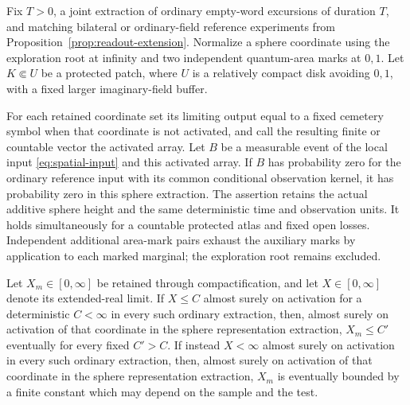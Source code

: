 \begin{proposition}
\label{prop:sphere-support}
Fix \(T>0\), a joint extraction of ordinary empty-word excursions of
duration \(T\), and matching bilateral or ordinary-field reference
experiments from Proposition~\ref{prop:readout-extension}.  Normalize
a sphere coordinate using the exploration root at infinity and two
independent quantum-area marks at \(0,1\).  Let \(K\Subset U\) be a
protected patch, where \(U\) is a relatively compact disk avoiding
\(0,1\), with a fixed larger imaginary-field buffer.

For each retained coordinate set its limiting output equal to a fixed
cemetery symbol when that coordinate is not activated, and call the
resulting finite or countable vector the activated array.  Let \(B\)
be a measurable event of the local input \eqref{eq:spatial-input} and
this activated array.  If \(B\) has probability zero for the ordinary
reference input with its common conditional observation kernel, it has
probability zero in this sphere extraction.  The assertion retains the
actual additive sphere height and the same deterministic time and
observation units.  It holds simultaneously for a countable protected
atlas and fixed open losses.  Independent additional area-mark pairs
exhaust the auxiliary marks by application to each marked marginal;
the exploration root remains excluded.

Let \(X_m\in[0,\infty]\) be retained through compactification, and
let \(X\in[0,\infty]\) denote its extended-real limit.  If \(X\le C\)
almost surely on activation for a deterministic \(C<\infty\) in every
such ordinary extraction, then, almost surely on activation of that
coordinate in the sphere representation extraction, \(X_m\le C'\)
eventually for every fixed \(C'>C\).  If instead \(X<\infty\) almost
surely on activation in every such ordinary extraction, then, almost
surely on activation of that coordinate in the sphere representation
extraction, \(X_m\) is eventually bounded by a finite constant which may
depend on the sample and the test.
\end{proposition}

